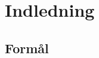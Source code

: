 \documentclass[Main]{subfiles}
\begin{document}
\chapter{Indledning}

\section{Formål}
\end{document}
